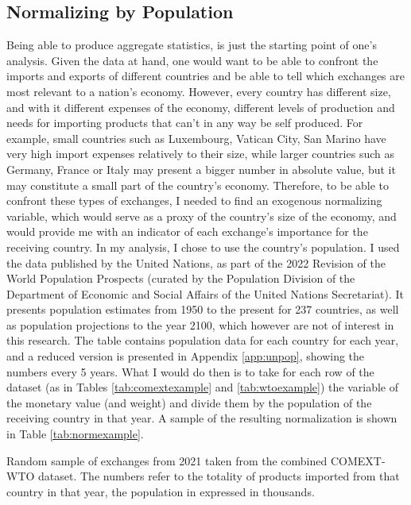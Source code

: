\subsection{Normalizing by Population}
Being able to produce aggregate statistics, is just the starting point of one's analysis. Given the data at hand, one would want to be able to confront the imports and exports of different countries and be able to tell which exchanges are most relevant to a nation's economy. However, every country has different size, and with it different expenses of the economy, different levels of production and needs for importing products that can't in any way be self produced. For example, small countries such as Luxembourg, Vatican City, San Marino have very high import expenses relatively to their size, while larger countries such as Germany, France or Italy may present a bigger number in absolute value, but it may constitute a small part of the country's economy.
Therefore, to be able to confront these types of exchanges, I needed to find an exogenous normalizing variable, which would serve as a proxy of the country's size of the economy, and would provide me with an indicator of each exchange's importance for the receiving country. 
In my analysis, I chose to use the country's population. I used the data published by the United Nations, as part of the 2022 Revision of the World Population Prospects \cite{un2022population} (curated by the Population Division of the Department of Economic and Social Affairs of the United Nations Secretariat). It presents population estimates from 1950 to the present for 237 countries, as well as population projections to the year 2100, which however are not of interest in this research. The table contains population data for each country for each year, and a reduced version is presented in Appendix \ref{app:unpop}, showing the numbers every 5 years.
What I would do then is to take for each row of the dataset (as in Tables \ref{tab:comextexample} and \ref{tab:wtoexample}) the variable of the monetary value (and weight) and divide them by the population of the receiving country in that year. A sample of the resulting normalization is shown in Table \ref{tab:normexample}. 

\begin{table}
    \centering
    
    \caption[Random sample of exchanges from 2021 taken from the combined COMEXT-WTO dataset]{Random sample of exchanges from 2021 taken from the combined COMEXT-WTO dataset. The numbers refer to the totality of products imported from that country in that year, the population in expressed in thousands.}
    \label{tab:normexample}
\end{table}

